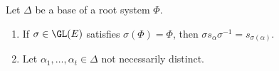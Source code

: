 Let $\Delta$ be a base of a root system $\Phi$.
\begin{enumerate}[label=(\alph*)]
	\item If $\sigma \in \GL(E)$ satisfies $\sigma(\Phi) = \Phi$, then
		$\sigma s_\alpha \sigma^{-1} = s_{\sigma(\alpha)}$.
	\item Let $\alpha_1, \ldots, \alpha_t \in \Delta$ not necessarily
		distinct.
\end{enumerate}
